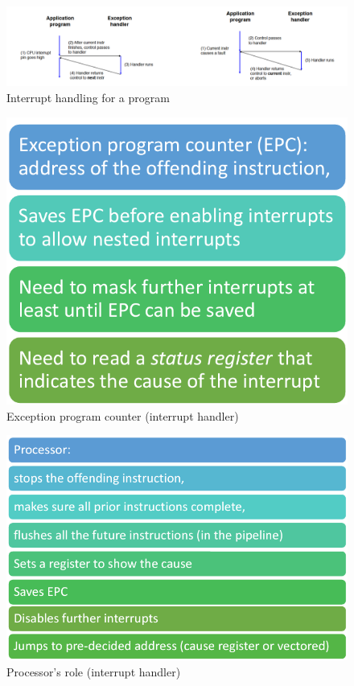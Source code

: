 \documentclass{scrartcl}
\begin{document}
\begin{figure}[h]
\centering
\includegraphics[scale=0.5]{Images/interrupt_exec.png}
\caption{Interrupt handling for a program}
\end{figure}

\begin{figure}[h]
\centering
\includegraphics[scale=0.5]{Images/interrupt_handler_1.png}
\caption{Exception program counter (interrupt handler)}
\end{figure}

\begin{figure}[h]
\centering
\includegraphics[scale=0.5]{Images/interrupt_handler_2.png}
\caption{Processor's role (interrupt handler)}
\end{figure}
\end{document}
